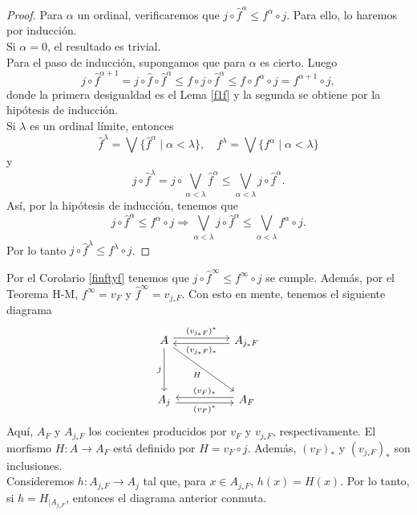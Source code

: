 \begin{proof}
    Para $\alpha$ un ordinal, verificaremos que $j\circ \hat{f}^\alpha\leq f^\alpha\circ j$. Para ello, lo haremos por inducción.\\

    Si $\alpha=0$, el resultado es trivial.\\

    Para el paso de inducción, supongamos que para $\alpha$ es cierto. Luego
    \[
    j\circ \hat{f}^{\alpha+1}=j\circ \hat{f}\circ \hat{f}^{\alpha}\leq  f\circ j\circ \hat{f}^\alpha\leq f\circ f^\alpha\circ j=f^{\alpha+1}\circ j,
    \]
    donde la primera desigualdad es el Lema \ref{f1f} y la segunda se obtiene por la hipótesis de inducción.\\

    Si $\lambda$ es un ordinal límite, entonces
	\[
	\hat{f}^\lambda=\bigvee\{\hat{f}^\alpha\mid \alpha<\lambda\}, \quad f^\lambda=\bigvee\{f^\alpha\mid \alpha<\lambda\} 
	\]
	y
	\[
		j\circ \hat{f}^\lambda=j\circ \bigvee_{\alpha<\lambda}\hat{f}^\alpha\leq\bigvee_{\alpha<\lambda}j\circ \hat{f}^\alpha.
	\]
	Así, por la hipótesis de inducción, tenemos que
	\[
	j\circ \hat{f}^\alpha\leq f^\alpha\circ j\Rightarrow \bigvee_{\alpha<\lambda}j\circ \hat{f}^\alpha\leq \bigvee_{\alpha<\lambda} f^\alpha\circ j.
	\]
	Por lo tanto $j\circ \hat{f}^\lambda\leq f^\lambda\circ j$.
\end{proof}

Por el Corolario \ref{finftyf} tenemos que $j\circ \hat{f}^\infty\leq f^\infty\circ j$ se cumple. Además, por el Teorema H-M, $f^\infty=v_F$ y $\hat{f}^\infty=v_{j_*F}$. Con esto en mente, tenemos el siguiente diagrama
\[\begin{tikzcd}
	A && {A_{j_*F}} \\
	\\
	{A_j} && {A_F}
	\arrow["{(v_{j_*F})^*}", shift left, from=1-1, to=1-3]
	\arrow["j"', from=1-1, to=3-1]
	\arrow["H"', from=1-1, to=3-3]
	\arrow["{(v_{j_*F})_*}", shift left, from=1-3, to=1-1]
	\arrow["{(v_F)^*}"', shift right, from=3-1, to=3-3]
	\arrow["{(v_F)_*}"', shift right, from=3-3, to=3-1]
\end{tikzcd}\]
Aquí, $A_F$ y $A_{j_*F}$ los cocientes producidos por $v_F$ y $v_{j_*F}$, respectivamente. El morfismo $H\colon A\to A_F$ está definido por $H=v_F\circ j$. Además, $(v_F)_*$ y $(v_{j_*F})_*$ son inclusiones.\\

Consideremos $h\colon A_{j_*F}\to A_j$ tal que, para $x\in A_{j_*F}$, $h(x)=H(x)$. Por lo tanto, si $h=H_{\mid{A_{j_*F}}}$, entonces el diagrama anterior conmuta.\\

